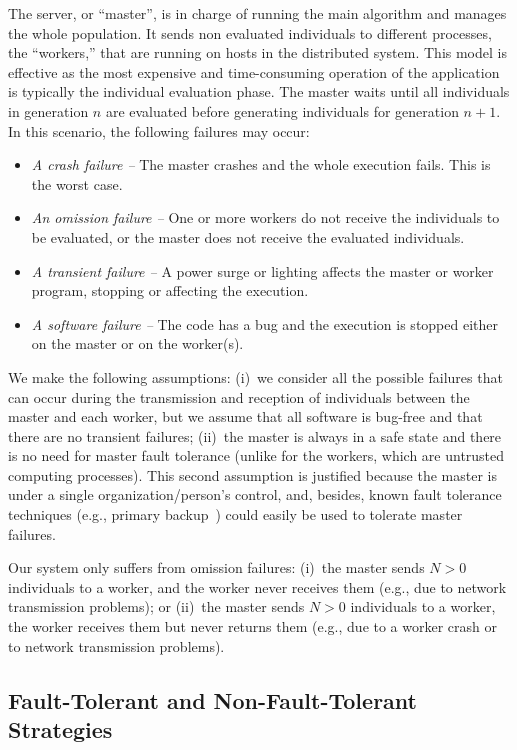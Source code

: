 \documentclass[graybox]{sty/svmult}
\begin{document}
The server, or ``master'', is in charge of running the main algorithm and
manages the whole population. It sends non evaluated individuals to
different processes, the ``workers,'' that are running on hosts
in the distributed system. This
model is effective as the most expensive and time-consuming operation
of the application is typically the individual evaluation phase.
The master waits until all individuals in generation $n$ are evaluated
before generating individuals for generation $n+1$. In this scenario,
the following failures may occur:
\begin{itemize}
    \item \emph{A crash failure --} The master crashes and the
    whole execution fails. This is the worst case.  
    \item \emph{An omission failure --} One or more workers do not receive the individuals to be
    evaluated, or the master does not receive the evaluated individuals.
    \item \emph{A transient failure --} A power surge or lighting affects
    the master or worker program, stopping or affecting the execution.
    \item \emph{A software failure --} The code has a bug and the execution
    is stopped either on the master or on the worker(s).
\end{itemize} 

We make the following assumptions: (i)~we consider all the possible
failures that can occur during the transmission and reception of
individuals between the master and each worker, but we assume that all
software is bug-free and that there are no transient failures; (ii)~the
master is always in a safe state and there is no need for master
fault tolerance (unlike for the workers, which are untrusted computing
processes).  This second assumption is justified because the master is under
a single organization/person's control, and, besides, known fault
tolerance techniques (e.g., primary backup~\cite{primary_backup}) could
easily be used to tolerate master failures.

Our system only suffers from omission failures: (i)~the master
sends $N>0$ individuals to a worker, and the worker never receives them
(e.g., due to network transmission problems); or (ii)~the master sends
$N>0$ individuals to a worker, the worker receives them but never returns
them (e.g., due to a worker crash or to network transmission problems).

\subsection{Fault-Tolerant and Non-Fault-Tolerant Strategies}
\label{strategies}
\end{document}
